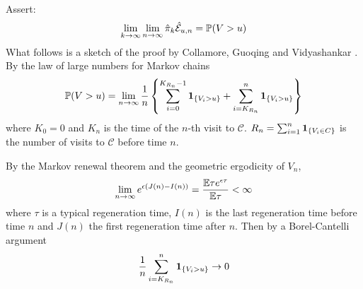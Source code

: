 \documentclass{beamer}
\begin{document}

\begin{frame}
  Assert:
  \[
  \lim_{k \to \infty} \lim_{n \to \infty} \hat{\pi}_k \hat{\mathcal
    E}_{u,n} = \P(V > u)
  \]
  What follows is a sketch of the proof by Collamore, Guoqing and
  Vidyashankar \cite{collamore2014}. By the law of large numbers for
  Markov chains
  \[
  \P(V > u) = \lim_{n \to \infty} {1 \over n} \left\{
  \sum_{i=0}^{K_{R_n} - 1} \1{V_i > u}
  +
  \sum_{i=K_{R_n}}^{n} \1{V_i > u}
  \right\}
  \]
  where $K_0 = 0$ and $K_n$ is the time of the $n$-th visit to
  $\mathcal C$. $R_n = \sum_{i=1}^n \1{V_i \in C}$ is the number of
  visits to $\mathcal C$ before time $n$.
\end{frame}

\begin{frame}
  By the Markov renewal theorem and the geometric ergodicity of $V_n$,
  \[
  \lim_{n \to \infty} e^{\epsilon(J(n) - I(n))} = {
    \E \tau e^{\epsilon \tau}
    \over
    \E \tau
  }  < \infty
  \]
  where $\tau$ is a typical regeneration time, $I(n)$ is the last
  regeneration time before time $n$ and $J(n)$ the first regeneration
  time after $n$. Then by a Borel-Cantelli argument
  \[
  {1 \over n}\sum_{i=K_{R_n}}^n \1{V_i > u} \to 0
  \]
\end{frame}



\end{document}
